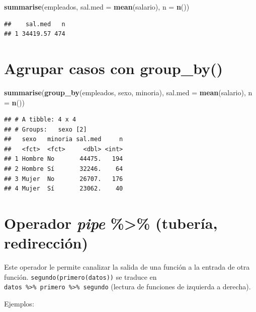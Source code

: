 \documentclass[]{book}
\newenvironment{Shaded}{\begin{snugshade}}{\end{snugshade}}
\newcommand{\KeywordTok}[1]{\textcolor[rgb]{0.13,0.29,0.53}{\textbf{#1}}}
\newcommand{\DataTypeTok}[1]{\textcolor[rgb]{0.13,0.29,0.53}{#1}}
\newcommand{\StringTok}[1]{\textcolor[rgb]{0.31,0.60,0.02}{#1}}
\newcommand{\OperatorTok}[1]{\textcolor[rgb]{0.81,0.36,0.00}{\textbf{#1}}}
\newcommand{\NormalTok}[1]{#1}
\begin{document}
\begin{Shaded}
\begin{Highlighting}[]
\KeywordTok{summarise}\NormalTok{(empleados, }\DataTypeTok{sal.med =} \KeywordTok{mean}\NormalTok{(salario), }\DataTypeTok{n =} \KeywordTok{n}\NormalTok{())}
\end{Highlighting}
\end{Shaded}

\begin{verbatim}
##    sal.med   n
## 1 34419.57 474
\end{verbatim}

\section{\texorpdfstring{Agrupar casos con
\textbf{group\_by()}}{Agrupar casos con group\_by()}}\label{agrupar-casos-con-group_by}

\begin{Shaded}
\begin{Highlighting}[]
\KeywordTok{summarise}\NormalTok{(}\KeywordTok{group_by}\NormalTok{(empleados, sexo, minoria), }\DataTypeTok{sal.med =} \KeywordTok{mean}\NormalTok{(salario), }\DataTypeTok{n =} \KeywordTok{n}\NormalTok{())}
\end{Highlighting}
\end{Shaded}

\begin{verbatim}
## # A tibble: 4 x 4
## # Groups:   sexo [2]
##   sexo   minoria sal.med     n
##   <fct>  <fct>     <dbl> <int>
## 1 Hombre No       44475.   194
## 2 Hombre Sí       32246.    64
## 3 Mujer  No       26707.   176
## 4 Mujer  Sí       23062.    40
\end{verbatim}

\section{\texorpdfstring{Operador \emph{pipe}
\textbf{\%\textgreater{}\%} (tubería,
redirección)}{Operador pipe \%\textgreater{}\% (tubería, redirección)}}\label{operador-pipe-tuberuxeda-redirecciuxf3n}

Este operador le permite canalizar la salida de una función a la entrada
de otra función. \texttt{segundo(primero(datos))} se traduce en
\texttt{datos\ \%\textgreater{}\%\ primero\ \%\textgreater{}\%\ segundo}
(lectura de funciones de izquierda a derecha).

Ejemplos:

\begin{Shaded}
\end{Shaded}
\end{document}
